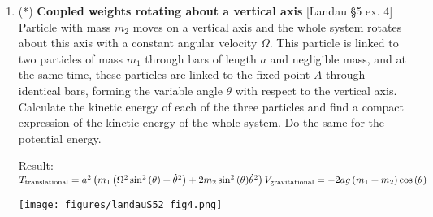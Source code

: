 \documentclass[11pt, a4paper, twoside]{article}
\begin{document}
\begin{enumerate}
\item
	\begin{minipage}[t][4.5cm]{0.65\textwidth}
		(*) \textbf{Coupled weights rotating about a vertical axis} [Landau \S5 ex. 4]\\
		Particle with mass $m_2$ moves on a vertical axis and the whole system rotates about this axis with a constant angular velocity $\Omega$. This particle is linked to two particles of mass $m_1$ through bars of length $a$ and negligible mass, and at the same time, these particles are linked to the fixed point $A$ through identical bars, forming the variable angle $\theta$ with respect to the vertical axis.
		Calculate the kinetic energy of each of the three particles and find a compact expression of the kinetic energy of the whole system. Do the same for the potential energy.

		Result:\\
		\(
			T_\text{translational} = a^{2} \left( m_{1} \left( \Omega^{2} \sin^{2}{\left(\theta \right)} + \dot{\theta}^{2}\right) + 2 m_{2} \sin^{2}{\left(\theta \right)} \dot{\theta}^{2} \right) \\
			V_\text{gravitational} = - 2 a g \left(m_{1} + m_{2}\right) \cos{\left(\theta \right)}
		\)
	\end{minipage}
	\begin{minipage}[c][1cm][t]{0.35\textwidth}
		\texttt{[image: figures/landauS52\_fig4.png]}
	\end{minipage}


\end{enumerate}
\end{document}
